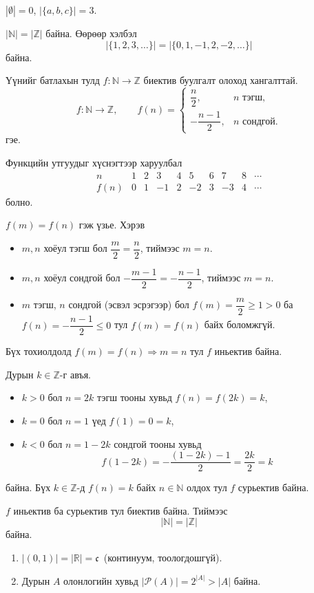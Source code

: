 \begin{example}
 $|\emptyset|=0$, \quad $|\{a,b,c\}|=3$.
\end{example}
\begin{example}
$|\mathbb{N}|=|\mathbb{Z}|$ байна. Өөрөөр хэлбэл $$|\{1, 2, 3, \ldots \}|=|\{0, 1, -1, 2, -2, \ldots\}|$$ байна.
 
Үүнийг батлахын тулд $f:\mathbb{N}\to\mathbb{Z}$
биектив буулгалт олоход хангалттай. 
\[
f:\mathbb{N}\to\mathbb{Z},\qquad
f(n)=
\begin{cases}
\dfrac{n}{2}, & n \text{ тэгш,}\\[8pt]
-\dfrac{n-1}{2}, & n \text{ сондгой.}
\end{cases}
\] гэе. 


Функцийн утгуудыг хүснэгтээр харуулбал 
\[
\begin{array}{c|ccccccccc}
n    & 1 & 2 & 3  & 4 & 5  & 6 & 7  & 8 & \cdots \\\hline
f(n) & 0 & 1 & -1 & 2 & -2 & 3 & -3 & 4 & \cdots
\end{array}
\]
болно. 

$f(m)=f(n)$ гэж үзье. Хэрэв 
\begin{itemize}
  \item $m,n$ хоёул тэгш бол
  $\dfrac{m}{2}=\dfrac{n}{2}$, тиймээс $m=n$.

  \item $m,n$ хоёул сондгой бол
  $-\dfrac{m-1}{2}=-\dfrac{n-1}{2}$, тиймээс $m=n$.

  \item $m$ тэгш, $n$ сондгой (эсвэл эсрэгээр) бол
  $f(m)=\dfrac{m}{2}\geq 1>0$ ба $f(n)=-\dfrac{n-1}{2}\leq 0$
  тул $f(m)=f(n)$ байх боломжгүй.
\end{itemize}
Бүх тохиолдолд $f(m)=f(n)\Rightarrow m=n$ тул $f$ иньектив байна.


Дурын $k\in\mathbb{Z}$-г авъя.
\begin{itemize}
  \item $k>0$ бол $n=2k$ тэгш тооны хувьд $f(n)=f(2k)=k$,
  \item $k=0$ бол $n=1$ үед $f(1)=0=k$,
  \item $k<0$ бол $n=1-2k$ сондгой тооны хувьд   
  \[
  f(1-2k)=-\frac{(1-2k)-1}{2}=\frac{2k}{2}=k
  \]
\end{itemize} байна.
Бүх $k\in\mathbb{Z}$-д $f(n)=k$ байх $n\in\mathbb{N}$ олдох тул $f$ сурьектив байна.


$f$ иньектив ба сурьектив тул биектив байна. Тиймээс $$|\mathbb{N}|=|\mathbb{Z}|$$ байна.
\end{example}
\begin{example}
    \begin{enumerate}
        \item $|(0,1)|=|\mathbb{R}|=\mathfrak{c}$ \,(континуум, тоологдошгүй).
  \item Дурын $A$ олонлогийн хувьд $|\mathcal{P}(A)|=2^{|A|}>|A|$ байна.
\end{enumerate}
\end{example}
